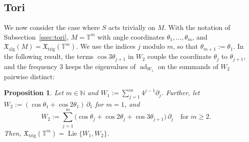 \documentclass{article}
\newcommand{\N}{\mathbb{N}}
\newcommand{\T}{\mathbb{T}}
\newcommand{\xalg}{\mathfrak X_{\mathrm{alg}}}
\newcommand{\xtrig}{\mathfrak X_{\mathrm{trig}}}
\newtheorem{proposition}[theorem]{Proposition}
\theoremstyle{definition}
\theoremstyle{plain}
\begin{document}
\subsection{Tori}\label{ssec:torus-two}

We now consider the case where $S$ acts trivially on $M$.
With the notation of Subsection~\ref{ssec:tori}, $M=\T^m$ with angle coordinates $\theta_1,\ldots,\theta_m$, and $\xalg(M)=\xtrig(\T^m)$.
We use the indices $j$ modulo $m$, so that $\theta_{m+1}:=\theta_1$.
In the following result, the terms $\cos3\theta_{j+1}$ in $W_2$ couple the coordinate $\theta_j$ to $\theta_{j+1}$, and the frequency $3$ keeps the eigenvalues of $\operatorname{ad}_{W_1}$ on the summands of $W_2$ pairwise distinct:

\begin{proposition}\label{prop:torus-two}
Let $m\in\N$ and $W_1:=\sum_{j=1}^m4^{j-1}\partial_j$.  Further, let $W_2:=(\cos\theta_1+\cos2\theta_1)\,\partial_1$ for $m=1$, and
$$
W_2:= \sum_{j=1}^m \bigl(\cos\theta_j+\cos2\theta_j+\cos3\theta_{j+1}\bigr) \, \partial_j    \quad\mbox{for } m\geq2.
$$
Then, $\xtrig(\T^m)=\operatorname{Lie}\{W_1,W_2\}$.
\end{proposition}
\end{document}
